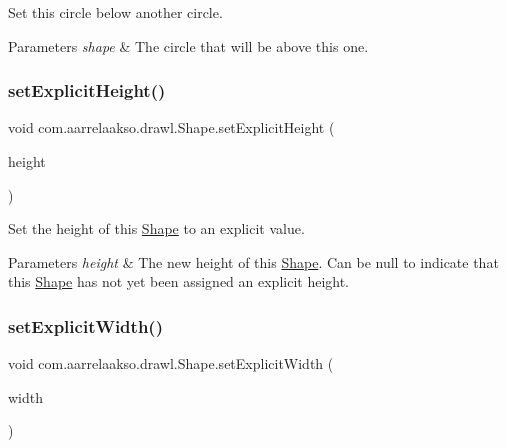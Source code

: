 Set this circle below another circle. 


\begin{DoxyParams}{Parameters}
{\em shape} & The circle that will be above this one. \\
\hline
\end{DoxyParams}
\mbox{\label{classcom_1_1aarrelaakso_1_1drawl_1_1_shape_ad3881ca048d83262948961f9f0ab23e3}} 
\subsubsection{\texorpdfstring{set\+Explicit\+Height()}{setExplicitHeight()}}
{\footnotesize\ttfamily void com.\+aarrelaakso.\+drawl.\+Shape.\+set\+Explicit\+Height (\begin{DoxyParamCaption}\item[{@Nullable \hyperlink{classcom_1_1aarrelaakso_1_1drawl_1_1_drawl_number}{Drawl\+Number}}]{height }\end{DoxyParamCaption})\hspace{0.3cm}{\ttfamily [protected]}}



Set the height of this \hyperlink{classcom_1_1aarrelaakso_1_1drawl_1_1_shape}{Shape} to an explicit value. 


\begin{DoxyParams}{Parameters}
{\em height} & The new height of this \hyperlink{classcom_1_1aarrelaakso_1_1drawl_1_1_shape}{Shape}. Can be {\ttfamily null} to indicate that this \hyperlink{classcom_1_1aarrelaakso_1_1drawl_1_1_shape}{Shape} has not yet been assigned an explicit height. \\
\hline
\end{DoxyParams}
\mbox{\label{classcom_1_1aarrelaakso_1_1drawl_1_1_shape_a71f8f1c75ff6eb7f2c4b4d80c80a665a}} 
\subsubsection{\texorpdfstring{set\+Explicit\+Width()}{setExplicitWidth()}}
{\footnotesize\ttfamily void com.\+aarrelaakso.\+drawl.\+Shape.\+set\+Explicit\+Width (\begin{DoxyParamCaption}\item[{@Nullable \hyperlink{classcom_1_1aarrelaakso_1_1drawl_1_1_drawl_number}{Drawl\+Number}}]{width }\end{DoxyParamCaption})\hspace{0.3cm}{\ttfamily [protected]}}



